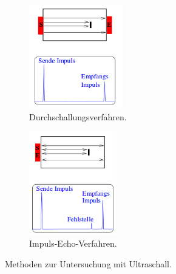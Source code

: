  \begin{figure}
     \centering
     \begin{subfigure}{0.48\textwidth}
         \centering
         \includegraphics[height=4.5cm]{ressources/dv.png}
         \caption[]%
         {{\small Durchschallungsverfahren.}}
         \label{fig:dv}
     \end{subfigure}
     \begin{subfigure}{0.48\textwidth}
         \centering
         \includegraphics[height=4.5cm]{ressources/ei.png}
         \caption[]%
         {{\small Impuls-Echo-Verfahren.}}
         \label{fig:ie}
     \end{subfigure}
     \caption[]
     {Methoden zur Untersuchung mit Ultraschall. \cite{skript}}
  \end{figure}
